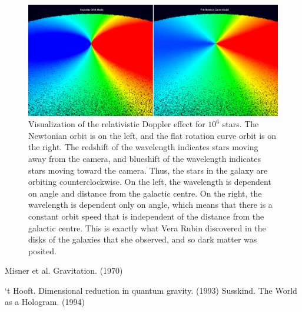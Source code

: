 \documentclass[12pt]{article}
\begin{document}
\begin{figure} 
\centering
\label{fig6}
  \includegraphics[width = 7 in]{doppler.png}
  \caption{
Visualization of the relativistic Doppler effect for $10^6$ stars.
The Newtonian orbit is on the left, and the flat rotation curve orbit is on the right.
The redshift of the wavelength indicates stars moving away from the camera, and blueshift of the wavelength indicates stars moving toward the camera.
Thus, the stars in the galaxy are orbiting counterclockwise.
On the left, the wavelength is dependent on angle and distance from the galactic centre.
On the right, the wavelength is dependent only on angle, which means that there is a constant orbit speed that is independent of the distance from the galactic centre.
This is exactly what Vera Rubin discovered in the disks of the galaxies that she observed, and so dark matter was posited.
}
\end{figure}


\begin{thebibliography}{9}

 Misner et al. Gravitation. (1970)

 `t Hooft. Dimensional reduction in quantum gravity. (1993)
 Susskind. The World as a Hologram. (1994)




\end{thebibliography}
\end{document}
